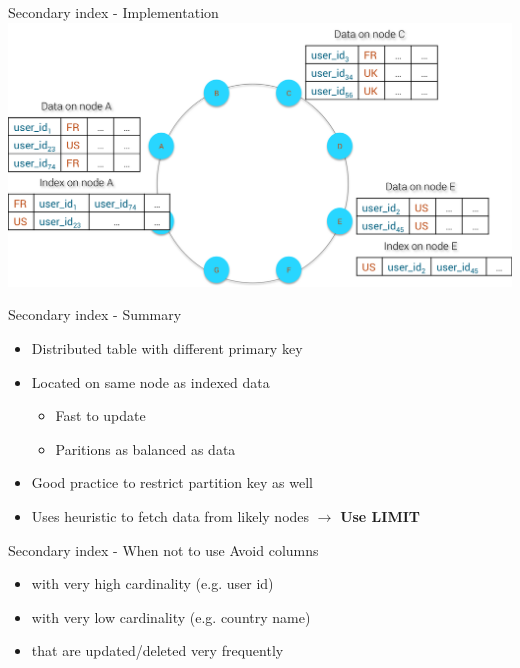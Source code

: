 \documentclass[10pt]{beamer}
\begin{document}
\begin{frame}{Secondary index - Implementation}
  \includegraphics[width=1.0\textwidth]{resources/distributed_index.png}
\end{frame}

\begin{frame}{Secondary index - Summary}
  \begin{itemize}
    \item Distributed table with different primary key
    \item Located on same node as indexed data
      \begin{itemize}
        \item Fast to update
        \item Paritions as balanced as data
      \end{itemize}
    \item Good practice to restrict partition key as well
    \item Uses heuristic to fetch data from likely nodes $\rightarrow$ \textbf{Use LIMIT}
  \end{itemize}
\end{frame}

\begin{frame}{Secondary index - When not to use}
  Avoid columns
  \begin{itemize}
    \item with very high cardinality (e.g. user id)
    \item with very low cardinality (e.g. country name)
    \item that are updated/deleted very frequently
  \end{itemize}
\end{frame}
\end{document}
